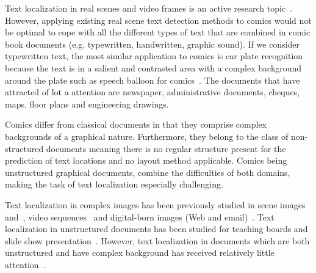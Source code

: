 
Text localization in real scenes and video frames is an active research topic~\cite{Jung04,ShahabICDAR2011Robust,KaratzasICDAR2013Robust}.
However, applying existing real scene text detection methods to comics would not be optimal to cope with all the different types of text that are combined in comic book documents (e.g. typewritten, handwritten, graphic sound).
If we consider typewritten text, the most similar application to comics is car plate recognition because the text is in a salient and contrasted area with a complex background around the plate such as speech balloon for comics~\cite{anagnostopoulos2008license}.
The documents that have attracted of lot a attention are newspaper, administrative documents, cheques, maps, floor plans and engineering drawings.

Comics differ from classical documents in that they comprise complex backgrounds of a graphical nature. Furthermore, they belong to the class of non-structured documents meaning there is no regular structure present for the prediction of text locations and no layout method applicable.
Comics being unstructured graphical documents, combine the difficulties of both domains, making the task of text localization especially challenging.

Text localization in complex images has been previously studied in scene images~\cite{Weinman09,Epshtein10,Neumann12} and~\cite{Wang10,Meng12}, video sequences~\cite{Wonjun09,Shivakumara09} and digital-born images (Web and email)~\cite{Karatzas07}. 
Text localization in unstructured documents has been studied for teaching boards and slide show presentation~\cite{Oliveira10,Nguyen2013BagOfSubjects}.
However, text localization in documents which are both unstructured and have complex background has received relatively little attention~\cite{Clavelli09}.

